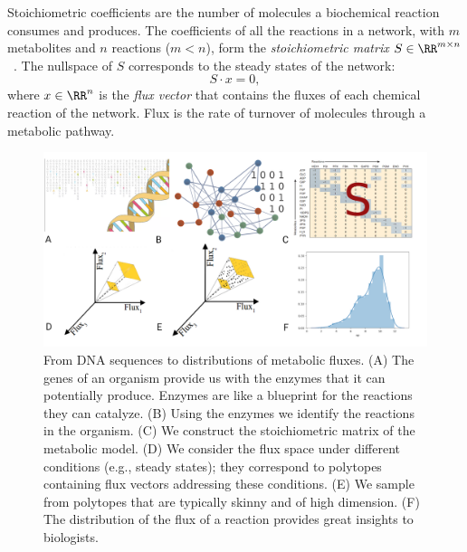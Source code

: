    Stoichiometric coefficients are the number of molecules a biochemical reaction
   consumes and produces. The coefficients of all the reactions in a network,
   with $m$ metabolites and $n$ reactions ($m < n$),  form
   the \emph{stoichiometric matrix} $S\in \RR^{m\times n}$~\cite{palsson2015systems}.
   The nullspace of $S$ corresponds to the steady states of the network:
   \begin{equation}
   \label{eq:Sv}
   S \cdot x = 0 ,
   \end{equation}
   where $x \in \RR^n $ is the \textit{flux vector} that contains  the fluxes
   of each chemical reaction of the network.
   Flux is the rate of turnover of molecules through a metabolic pathway.
   \begin{figure}[!htbp]
      \includegraphics[width=1.0\columnwidth]{figures/flux_sampling_workflow.png}
      \caption[From DNA sequences to distributions of metabolic fluxes]{
         From DNA sequences to distributions of metabolic fluxes.
         (A) The genes of an organism provide us with the enzymes that it can potentially produce. Enzymes are like a blueprint for the reactions they can catalyze.
         (B) Using the enzymes we identify the reactions in the organism.
         (C) We construct the stoichiometric matrix of the metabolic  model.
         (D) We consider the flux space under different conditions (e.g., steady states);
         they correspond  to  polytopes containing flux vectors addressing these conditions.
         (E) We sample from polytopes that are typically skinny and of high dimension.
         (F) The distribution of the flux of a reaction provides  great insights
         to biologists.
      }
      \label{fig:sampling_workflow}
   \end{figure}


